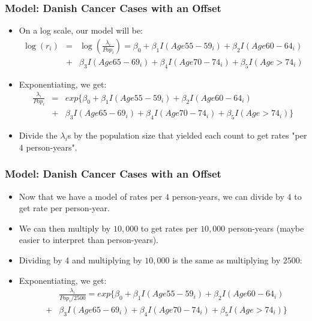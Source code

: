 \documentclass[10pt,xcolor={svgnames},t]{beamer}
\begin{document}
\begin{frame}
	\frametitle{Model: Danish Cancer Cases with an Offset}
	
	\begin{itemize}
		
		\item On a log scale, our model will be: 	
		\begin{eqnarray*}
			\log(r_{i})&=&\log(\frac{\lambda_i}{Pop_i} )=\beta_0 +\beta_1 I(Age55-59_i)+\beta_2 I(Age60-64_i) \\
			&+&\beta_3 I(Age65-69_i)+\beta_4 I(Age70-74_i)+\beta_5 I(Age>74_i)
		\end{eqnarray*} 
		
		\item Exponentiating, we get:
		\begin{eqnarray*}
			\frac{\lambda_i}{Pop_i} &=& exp\{ \beta_0 +\beta_1 I(Age55-59_i)+\beta_2 I(Age60-64_i) \\
			&+&\beta_3 I(Age65-69_i)+\beta_4 I(Age70-74_i)+\beta_5 I(Age>74_i) \}
		\end{eqnarray*} 
		\item Divide the $\lambda_i$s by the population size that yielded each count to get rates "per $4$ person-years".
	\end{itemize}
	
	
\end{frame}
%

\begin{frame}
	\frametitle{Model: Danish Cancer Cases with an Offset}
	
	\begin{itemize}
		
		\item Now that we have a model of rates per $4$ person-years, we can divide by $4$ to get rate per person-year.
				\bigskip
		\item We can then multiply by $10,000$ to get rates per $10,000$ person-years (maybe easier to interpret than person-years).
				\bigskip
		\item Dividing by 4 and multiplying by $10,000$ is the same as multiplying by $2500$:
				\bigskip
		\item Exponentiating, we get:
		\begin{eqnarray*}
			&&\frac{\lambda_i}{Pop_i/2500} = exp\{ \beta_0 +\beta_1 I(Age55-59_i)+\beta_2 I(Age60-64_i) \\
			&+&\beta_3 I(Age65-69_i)+\beta_4 I(Age70-74_i)+\beta_5 I(Age>74_i) \}
		\end{eqnarray*} 
	\end{itemize}
	
	
\end{frame}
%
\end{document}
